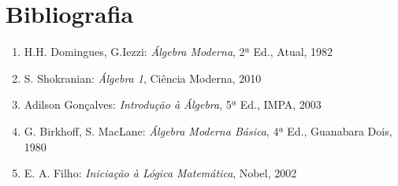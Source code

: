 \chapter{Bibliografia}
\begin{enumerate}
\item H.H. Domingues, G.Iezzi: \textit{{\'A}lgebra Moderna}, 2ª Ed., Atual, 1982
\item S. Shokranian: \textit{{\'A}lgebra 1}, Ci{\^e}ncia Moderna, 2010
\item Adilson Gon{\c c}alves: \textit{Introdu{\c c}{\~a}o {\`a} {\'A}lgebra}, 5ª Ed., IMPA, 2003
\item G. Birkhoff, S. MacLane: \textit{{\'A}lgebra Moderna B{\'a}sica}, 4ª Ed., Guanabara Dois, 1980
\item E. A. Filho: \textit{Inicia{\c c}{\~a}o {\`a} L{\'o}gica Matem{\'a}tica}, Nobel, 2002

\end{enumerate}